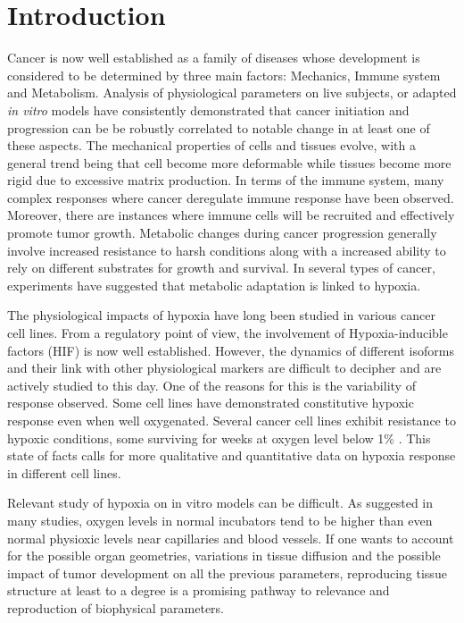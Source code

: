 \documentclass[11pt,a4paper]{article}
\begin{document}
\section{Introduction}
Cancer is now well established as a family of diseases whose development is considered to be determined by three main factors: Mechanics, Immune system and Metabolism. Analysis of physiological parameters on live subjects, or adapted \textit{in vitro} models have consistently demonstrated that cancer initiation and progression can be be robustly correlated to notable change in at least one of these aspects. The mechanical properties of cells and tissues evolve, with a general trend being that cell become more deformable while tissues become more rigid due to excessive matrix production.\cite{Chin2016} In terms of the immune system, many complex responses where cancer deregulate immune response have been observed.\cite{Pardoll2015} Moreover, there are instances where immune cells will be recruited and effectively promote tumor growth. Metabolic changes during cancer progression generally involve increased resistance to harsh conditions along with a increased ability to rely on different substrates for growth and survival. In several types of cancer, experiments have suggested that metabolic adaptation is linked to hypoxia.\cite{Rakotomalala2021}

The physiological impacts of hypoxia have long been studied in various cancer cell lines. From a regulatory point of view, the involvement of Hypoxia-inducible factors (HIF) is now well established.\cite{Strickland2017}\cite{Chen2021} However, the dynamics of different isoforms and their link with other physiological markers are difficult to decipher and are actively studied to this day. One of the reasons for this is the variability of response observed. Some cell lines have demonstrated constitutive hypoxic response even when well oxygenated. Several cancer cell lines exhibit resistance to hypoxic conditions, some surviving for weeks at oxygen level below 1\% \cite{McKeown2014}. This state of facts calls for more qualitative and quantitative data on hypoxia response in different cell lines.

Relevant study of hypoxia on in vitro models can be difficult. As suggested in many studies, oxygen levels in normal incubators tend to be higher than even normal physioxic levels near capillaries and blood vessels.\cite{McKeown2014} If one wants to account for the possible organ geometries, variations in tissue diffusion and the possible impact of tumor development on all the previous parameters, reproducing tissue structure at least to a degree is a promising pathway to relevance and reproduction of biophysical parameters.
\end{document}
